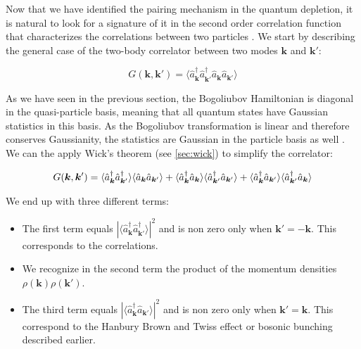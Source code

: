 \label{sec:2nd_order_bogo}

Now that we have identified the \kmk pairing mechanism in the quantum depletion, it is natural to look for a signature of it in the second order correlation function that characterizes the correlations between two particles \cite{butera2020,mathey2009noise,toth2008theory}. We start by describing the general case of the two-body correlator between two modes $\bm{k}$ and $\bm{k'}$:

\begin{equation}
    G(\bm{k},\bm{k}')=\langle \hat{a}^{\dagger}_{\bm{k}} \hat{a}^{\dagger}_{\bm k'} \hat{a}_{\bm k} \hat{a}_{\bm {k}'} \rangle
\end{equation}

As we have seen in the previous section, the Bogoliubov Hamiltonian is diagonal in the quasi-particle basis, meaning that all quantum states have Gaussian statistics in this basis. As the Bogoliubov transformation is linear and therefore conserves Gaussianity, the statistics are Gaussian in the particle basis as well \cite{butera2020}. We can the apply Wick's theorem (see \ref{sec:wick}) to simplify the correlator:

\begin{equation}
    G(\bm{k},\bm{k}')=\langle \hat{a}^{\dagger}_{\bm k} \hat{a}^{\dagger}_{\bm {k}'} \rangle \langle\hat{a}_{\bm k} \hat{a}_{\bm {k}'}\rangle + \langle \hat{a}^{\dagger}_{\bm k} \hat{a}_{\bm k} \rangle \langle \hat{a}^{\dagger}_{\bm {k}'} \hat{a}_{\bm {k}'} \rangle + \langle \hat{a}^{\dagger}_{\bm k} \hat{a}_{\bm {k}'} \rangle \langle \hat{a}^{\dagger}_{\bm {k}'} \hat{a}_{\bm k} \rangle
    \label{eq:wick_bogo}
\end{equation}

We end up with three different terms:

\begin{itemize}
    \item The first term equals $| \langle \hat{a}^{\dagger}_{\bm k} \hat{a}^{\dagger}_{\bm {k}'} \rangle |^2$ and is non zero only when $\bm{k}'=-\bm{k}$. This corresponds to the \kmk correlations.
    \item We recognize in the second term the product of the momentum densities $\rho(\bm{k}) \rho(\bm{k}')$.
    \item The third term equals $| \langle \hat{a}^{\dagger}_{\bm k} \hat{a}_{\bm {k}'} \rangle |^2$ and is non zero only when $\bm{k}'=\bm{k}$. This correspond to the Hanbury Brown and Twiss effect or bosonic bunching described earlier.
\end{itemize}

